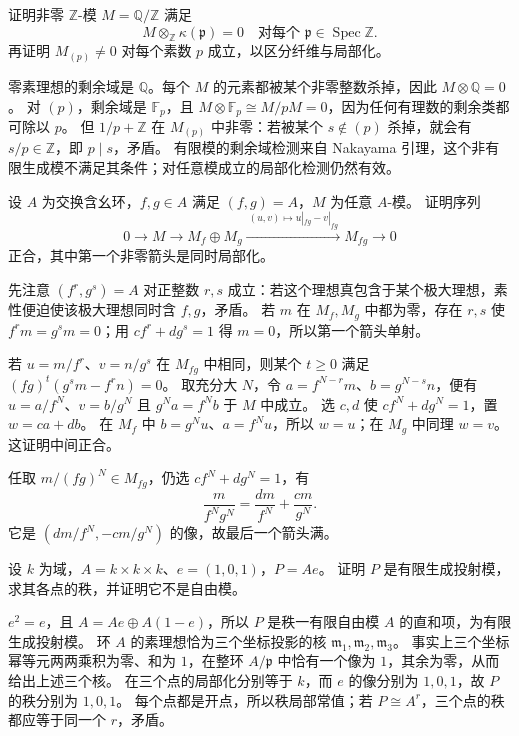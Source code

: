 \begin{exercise}\label{g5:ex:all-fibres-zero-infinite}
	证明非零 \(\mathbb Z\)-模 \(M=\mathbb Q/\mathbb Z\) 满足
	\[
	M\otimes_{\mathbb Z}\kappa(\mathfrak p)=0
	\quad\text{对每个 }\mathfrak p\in\operatorname{Spec}\mathbb Z.
	\]
	再证明 \(M_{(p)}\ne0\) 对每个素数 \(p\) 成立，以区分纤维与局部化。
\end{exercise}
\begin{solution}
	零素理想的剩余域是 \(\mathbb Q\)。每个 \(M\) 的元素都被某个非零整数杀掉，因此 \(M\otimes\mathbb Q=0\)。 对 \((p)\)，剩余域是 \(\mathbb F_p\)，且 \(M\otimes\mathbb F_p\cong M/pM=0\)，因为任何有理数的剩余类都可除以 \(p\)。 但 \(1/p+\mathbb Z\) 在 \(M_{(p)}\) 中非零：若被某个 \(s\notin(p)\) 杀掉，就会有 \(s/p\in\mathbb Z\)，即 \(p\mid s\)，矛盾。 有限模的剩余域检测来自 Nakayama 引理，这个非有限生成模不满足其条件；对任意模成立的局部化检测仍然有效。
\end{solution}

\begin{exercise}\label{g5:ex:module-two-open-gluing}
	设 \(A\) 为交换含幺环，\(f,g\in A\) 满足 \((f,g)=A\)，\(M\) 为任意 \(A\)-模。 证明序列
	\[
	0\longrightarrow M\longrightarrow M_f\oplus M_g
	\xrightarrow{\ (u,v)\mapsto u|_{fg}-v|_{fg}\ }M_{fg}
	\longrightarrow0
	\]
	正合，其中第一个非零箭头是同时局部化。
\end{exercise}
\begin{solution}
	先注意 \((f^r,g^s)=A\) 对正整数 \(r,s\) 成立：若这个理想真包含于某个极大理想，素性便迫使该极大理想同时含 \(f,g\)，矛盾。 若 \(m\) 在 \(M_f,M_g\) 中都为零，存在 \(r,s\) 使 \(f^rm=g^sm=0\)；用 \(cf^r+dg^s=1\) 得 \(m=0\)，所以第一个箭头单射。

	若 \(u=m/f^r\)、\(v=n/g^s\) 在 \(M_{fg}\) 中相同，则某个 \(t\geq0\) 满足 \((fg)^t(g^sm-f^rn)=0\)。 取充分大 \(N\)，令 \(a=f^{N-r}m\)、\(b=g^{N-s}n\)，便有 \(u=a/f^N\)、\(v=b/g^N\) 且 \(g^Na=f^Nb\) 于 \(M\) 中成立。 选 \(c,d\) 使 \(cf^N+dg^N=1\)，置 \(w=ca+db\)。 在 \(M_f\) 中 \(b=g^Nu\)、\(a=f^Nu\)，所以 \(w=u\)；在 \(M_g\) 中同理 \(w=v\)。 这证明中间正合。

	任取 \(m/(fg)^N\in M_{fg}\)，仍选 \(cf^N+dg^N=1\)，有
	\[
	\frac{m}{f^Ng^N}=\frac{dm}{f^N}+\frac{cm}{g^N}.
	\]
	它是 \((dm/f^N,-cm/g^N)\) 的像，故最后一个箭头满。
\end{solution}

\begin{exercise}\label{g5:ex:idempotent-variable-rank}
	设 \(k\) 为域，\(A=k\times k\times k\)、\(e=(1,0,1)\)，\(P=Ae\)。 证明 \(P\) 是有限生成投射模，求其各点的秩，并证明它不是自由模。
\end{exercise}
\begin{solution}
	\(e^2=e\)，且 \(A=Ae\oplus A(1-e)\)，所以 \(P\) 是秩一有限自由模 \(A\) 的直和项，为有限生成投射模。 环 \(A\) 的素理想恰为三个坐标投影的核 \(\mathfrak m_1,\mathfrak m_2,\mathfrak m_3\)。 事实上三个坐标幂等元两两乘积为零、和为 \(1\)，在整环 \(A/\mathfrak p\) 中恰有一个像为 \(1\)，其余为零，从而给出上述三个核。 在三个点的局部化分别等于 \(k\)，而 \(e\) 的像分别为 \(1,0,1\)，故 \(P\) 的秩分别为 \(1,0,1\)。 每个点都是开点，所以秩局部常值；若 \(P\cong A^r\)，三个点的秩都应等于同一个 \(r\)，矛盾。
\end{solution}

